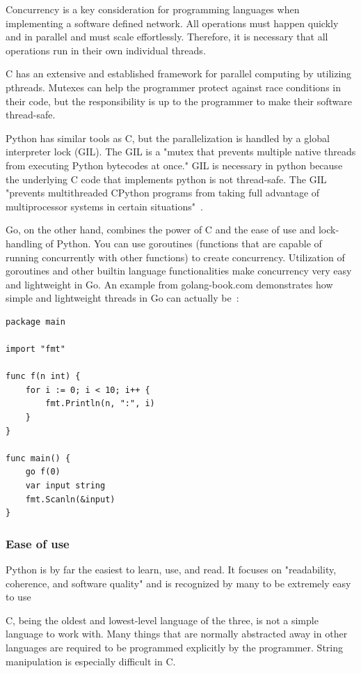 \documentclass[10pt,letterpaper,onecolumn,draftclsnofoot]{IEEEtran}
\begin{document}
Concurrency is a key consideration for programming languages when implementing a
software defined network. All operations must happen quickly and in parallel and
must scale effortlessly. Therefore, it is necessary that all operations run in
their own individual threads.

C has an extensive and established framework for parallel computing by utilizing
pthreads. Mutexes can help the programmer protect against race conditions in
their code, but the responsibility is up to the programmer to make their
software thread-safe.

Python has similar tools as C, but the parallelization is handled by a global
interpreter lock (GIL). The GIL is a "mutex that prevents multiple native
threads from executing Python bytecodes at once." GIL is necessary in python
because the underlying C code that implements python is not thread-safe. The GIL
"prevents multithreaded CPython programs from taking full advantage of
multiprocessor systems in certain situations"~\cite{GIL}.

Go, on the other hand, combines the power of C and the ease of use and
lock-handling of Python. You can use goroutines (functions that are capable of
running concurrently with other functions) to create concurrency. Utilization of
goroutines and other builtin language functionalities make concurrency very easy
and lightweight in Go. An example from golang-book.com demonstrates how simple
and lightweight threads in Go can actually be~\cite{goroutines}:

\begin{lstlisting}
package main

import "fmt"

func f(n int) {
	for i := 0; i < 10; i++ {
		fmt.Println(n, ":", i)
	}
}

func main() {
	go f(0)
	var input string
	fmt.Scanln(&input)
}
\end{lstlisting}

\subsubsection{Ease of use}

Python is by far the easiest to learn, use, and read. It focuses on
"readability, coherence, and software quality" and is recognized by many to be
extremely easy to use~\cite{learningpython}

C, being the oldest and lowest-level language of the three, is not a simple
language to work with. Many things that are normally abstracted away in other
languages are required to be programmed explicitly by the programmer. String
manipulation is especially difficult in C.
\end{document}
